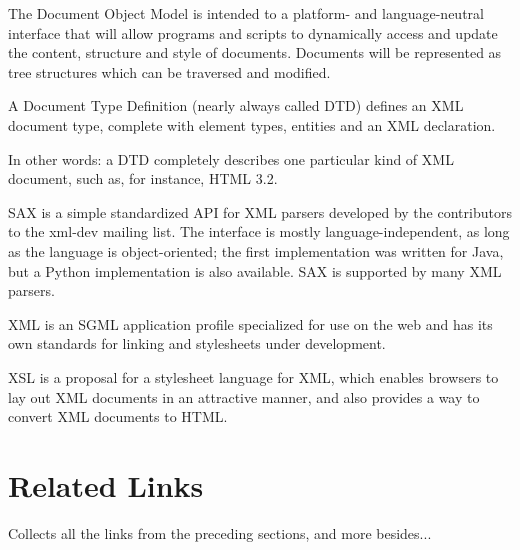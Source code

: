 \documentclass{howto}
\begin{document}
\begin{definitions}
%
The Document Object Model is intended to a platform- and
language-neutral interface that will allow programs and scripts to
dynamically access and update the content, structure and style of
documents. Documents will be represented as tree structures which can
be traversed and modified.

%
A Document Type Definition (nearly always called DTD) defines
an XML document type, complete with element types, entities
and an XML declaration.
       
In other words: a DTD completely describes one particular kind
of XML document, such as, for instance, HTML 3.2.
        
%
SAX is a simple standardized API for XML parsers developed by the
contributors to the xml-dev mailing list. The interface is mostly
language-independent, as long as the language is object-oriented; the
first implementation was written for Java, but a Python implementation
is also available.  SAX is supported by many
XML parsers.
          
%
XML is an SGML application profile specialized for use on the
web and has its own standards for linking and stylesheets under development.
          

%
XSL is a proposal for a stylesheet language for XML, which
enables browsers to lay out XML documents in an attractive
manner, and also provides a way to convert XML documents to
HTML.
\end{definitions}
          
\section{Related Links}

Collects all the links from the preceding sections, and more besides...
\end{document}
